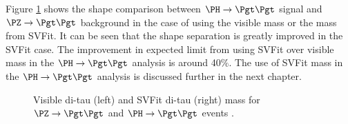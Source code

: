Figure \ref{fig:svfit} shows the shape comparison between $\PH\to\Pgt\Pgt$ signal
and $\PZ \to \Pgt\Pgt$ background in the case of using the visible mass or the mass from SVFit. It can
be seen that the shape separation is greatly improved in the SVFit case.
The improvement in expected limit from using SVFit over visible mass in the $\PH
\to \Pgt\Pgt$ analysis is around 40$\%$. The use of SVFit mass in the
$\PH\to\Pgt\Pgt$ analysis is discussed further in the next chapter.

\begin{figure}[tbh]
\begin{center}
\end{center}
\caption{ Visible di-tau (left) and SVFit di-tau (right) mass for $\ZToTauTau$
and $\HToTauTau$ events \cite{HIG-13-004}.
} 
\label{fig:svfit}
\end{figure}






